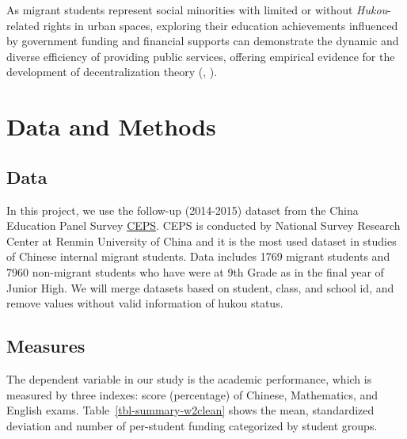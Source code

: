 \documentclass[
  man,
  floatsintext,
  longtable,
  nolmodern,
  notxfonts,
  notimes,
  colorlinks=true,linkcolor=blue,citecolor=blue,urlcolor=blue]{apa7}
\begin{document}
As migrant students represent social minorities with limited or without
\emph{Hukou}-related rights in urban spaces, exploring their education
achievements influenced by government funding and financial supports can
demonstrate the dynamic and diverse efficiency of providing public
services, offering empirical evidence for the development of
decentralization theory
(,
).

\section{Data and Methods}\label{data-and-methods}

\subsection{Data}\label{data}

In this project, we use the follow-up (2014-2015) dataset from the China
Education Panel Survey
\href{http://ceps.ruc.edu.cn/English/Home.htm}{CEPS}. CEPS is conducted
by National Survey Research Center at Renmin University of China and it
is the most used dataset in studies of Chinese internal migrant
students. Data includes 1769 migrant students and 7960 non-migrant
students who have were at 9th Grade as in the final year of Junior High.
We will merge datasets based on student, class, and school id, and
remove values without valid information of hukou status.

\subsection{Measures}\label{measures}

The dependent variable in our study is the academic performance, which
is measured by three indexes: score (percentage) of Chinese,
Mathematics, and English exams. Table~\ref{tbl-summary-w2clean} shows
the mean, standardized deviation and number of per-student funding
categorized by student groups.
\end{document}
